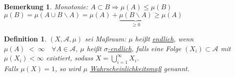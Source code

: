 \documentclass[11pt]{memoir}
\theoremstyle{changebreak}
\newtheorem{Definition}{Definition}[chapter]
\newtheorem{Bemerkung}{Bemerkung}[chapter]
\begin{document}
\begin{Bemerkung}
Monotonie: $A \subset B \Rightarrow \mu(A) \leq \mu(B)$\\
$\mu(B) = \mu(A \cup B\backslash A) = \mu(A) + \underbrace{\mu(B\backslash A)}_{\geq 0}\geq \mu(A)$
\end{Bemerkung}

\begin{Definition}
$(X, \mathscr{A}, \mu)$ sei Maßraum: $\mu$ heißt \underline{endlich}, wenn $\mu(A)\; <\; \infty \quad \forall A \in \mathscr{A}$, $\mu$ heißt \underline{$\sigma$-endlich}, falls eine Folge $(X_i) \subset \mathscr{A}$ mit $\mu(X_i) < \infty $ existiert, sodass $X = \bigcup\limits_{i=1}^{\infty} X_i$. \\
Falls $\mu(X) = 1$, so wird $\mu$ \underline{Wahrscheinlichkeitsmaß} genannt.
\end{Definition}
\end{document}
